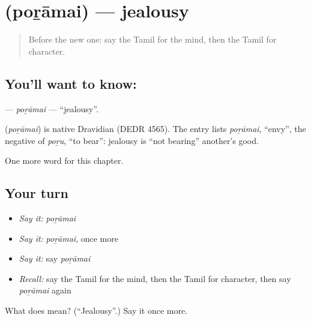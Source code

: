 \section[\texorpdfstring{\ta{பொறாமை} (poṟāmai)}{பொறாமை (poṟāmai)}]{ (poṟāmai) — jealousy}

\label{lesson:TA-C210-poramai}



\begin{quote}
Before the new one: say the Tamil for the mind, then the Tamil for character.
\end{quote}

\subsection*{You'll want to know: }
\textbf{} — \emph{poṟāmai} — \textquotedblleft{}jealousy\textquotedblright{}.

\begin{cousinweb}
\textbf{} (\emph{poṟāmai}) is native Dravidian (DEDR 4565). The entry lists \emph{poṟāmai}, \textquotedblleft{}envy\textquotedblright{}, the negative of \emph{poṟu}, \textquotedblleft{}to bear\textquotedblright{}: jealousy is \textquotedblleft{}not bearing\textquotedblright{} another's good.
\end{cousinweb}

\begin{grammarlens}[title={What you've built}]
One more word for this chapter.
\end{grammarlens}

\subsection*{Your turn}
\begin{itemize}
\raggedright
  \item \emph{Say it:} \emph{poṟāmai}
  \item \emph{Say it:} \emph{poṟāmai}, once more
  \item \emph{Say it:} say \emph{poṟāmai}
  \item \emph{Recall:} say the Tamil for the mind, then the Tamil for character, then say \emph{poṟāmai} again
\end{itemize}

\begin{tcolorbox}[breakable,colback=teal!4,colframe=teal!35!black,title={Before you move on}]
What does  mean? (\textquotedblleft{}Jealousy\textquotedblright{}.) Say it once more.
\end{tcolorbox}
